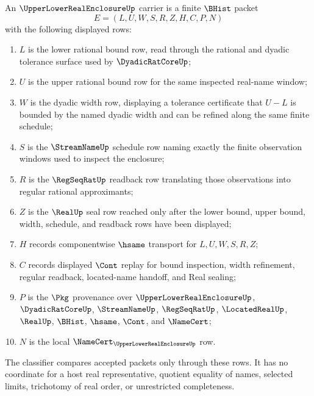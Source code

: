 \begin{definition}
\label{def:upper-lower-real-enclosure-carrier}
An $\UpperLowerRealEnclosureUp$ carrier is a finite $\BHist$ packet
$$
E=(L,U,W,S,R,Z,H,C,P,N)
$$
with the following displayed rows:
\begin{enumerate}
\item $L$ is the lower rational bound row, read through the rational and dyadic tolerance surface used by $\DyadicRatCoreUp$;
\item $U$ is the upper rational bound row for the same inspected real-name window;
\item $W$ is the dyadic width row, displaying a tolerance certificate that $U-L$ is bounded by the named dyadic width and can be refined along the same finite schedule;
\item $S$ is the $\StreamNameUp$ schedule row naming exactly the finite observation windows used to inspect the enclosure;
\item $R$ is the $\RegSeqRatUp$ readback row translating those observations into regular rational approximants;
\item $Z$ is the $\RealUp$ seal row reached only after the lower bound, upper bound, width, schedule, and readback rows have been displayed;
\item $H$ records componentwise $\hsame$ transport for $L,U,W,S,R,Z$;
\item $C$ records displayed $\Cont$ replay for bound inspection, width refinement, regular readback, located-name handoff, and Real sealing;
\item $P$ is the $\Pkg$ provenance over $\UpperLowerRealEnclosureUp$, $\DyadicRatCoreUp$, $\StreamNameUp$, $\RegSeqRatUp$, $\LocatedRealUp$, $\RealUp$, $\BHist$, $\hsame$, $\Cont$, and $\NameCert$;
\item $N$ is the local $\NameCert_{\UpperLowerRealEnclosureUp}$ row.
\end{enumerate}
The classifier compares accepted packets only through these rows. It has no coordinate for a host real representative, quotient equality of names, selected limits, trichotomy of real order, or unrestricted completeness.
\end{definition}

